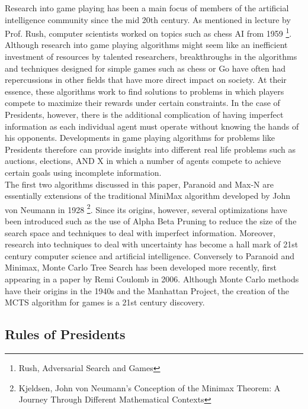 \documentclass[11pt]{article}
\begin{document}
Research into game playing has been a main focus of members of the artificial intelligence community since the mid 20th century. As mentioned in lecture by Prof. Rush, computer scientists worked on topics such as chess AI from 1959 \footnote{Rush, Adversarial Search and Games}. Although research into game playing algorithms might seem like an inefficient investment of resources by talented researchers, breakthroughs in the algorithms and techniques designed for  simple games such as chess or Go have often had repercussions in other fields that have more direct impact on society. At their essence, these algorithms work to find solutions to problems in which players compete to maximize their rewards under certain constraints. In the case of Presidents, however, there is the additional complication of having imperfect information as each individual agent must operate without knowing the hands of his opponents. Developments in game playing algorithms for problems like Presidents therefore can provide insights into different real life problems such as auctions, elections, AND X in which a number of agents compete to achieve certain goals using incomplete information.  \\

The first two algorithms discussed in this paper, Paranoid and Max-N are essentially extensions of the traditional MiniMax algorithm developed by John von Neumann in 1928 \footnote{Kjeldsen, John von Neumann's Conception of the Minimax Theorem: A Journey Through Different Mathematical Contexts}. Since its origins, however, several optimizations have been introduced such as the use of Alpha Beta Pruning to reduce the size of the search space and techniques to deal with imperfect information. Moreover, research into techniques to deal with uncertainty has become a hall mark of 21st century computer science and artificial intelligence. Conversely to Paranoid and Minimax, Monte Carlo Tree Search has been developed more recently, first appearing in a paper by Remi Coulomb in 2006. Although Monte Carlo methods have their origins in the 1940s and the Manhattan Project, the creation of the MCTS algorithm for games is a 21st century discovery.


\subsection{Rules of Presidents}
\end{document}
